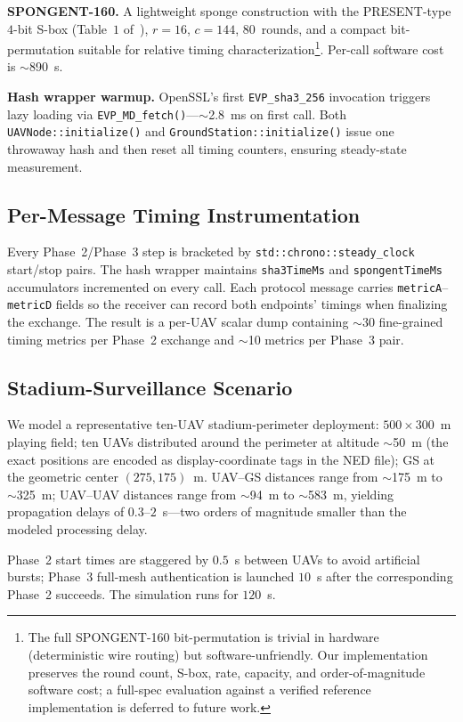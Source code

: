 \documentclass[journal,a4paper,10pt]{IEEEtran}
\begin{document}
\textbf{SPONGENT-160.} A lightweight sponge construction with the
PRESENT-type $4$-bit S-box (Table~$1$ of~\cite{spongent_original}),
$r{=}16$, $c{=}144$, $80$~rounds, and a compact bit-permutation
suitable for relative timing
characterization\footnote{The full SPONGENT-160 bit-permutation is
trivial in hardware (deterministic wire routing) but
software-unfriendly. Our implementation preserves the round count,
S-box, rate, capacity, and order-of-magnitude software cost; a
full-spec evaluation against a verified reference implementation is
deferred to future work.}. Per-call software cost is
$\sim$890~\textmu s.

\textbf{Hash wrapper warmup.} OpenSSL's first \texttt{EVP\_sha3\_256}
invocation triggers lazy loading via
\texttt{EVP\_MD\_fetch()}---$\sim$2.8~ms on first call. Both
\texttt{UAVNode::initialize()} and \texttt{GroundStation::initialize()}
issue one throwaway hash and then reset all timing counters, ensuring
steady-state measurement.

\subsection{Per-Message Timing Instrumentation}
Every Phase~2/Phase~3 step is bracketed by
\texttt{std::chrono::steady\_clock} start/stop pairs. The hash wrapper
maintains \texttt{sha3TimeMs} and \texttt{spongentTimeMs} accumulators
incremented on every call. Each protocol message carries
\texttt{metricA}--\texttt{metricD} fields so the receiver can record
both endpoints' timings when finalizing the exchange. The result is
a per-UAV scalar dump containing $\sim$30 fine-grained timing metrics
per Phase~2 exchange and $\sim$10 metrics per Phase~3 pair.

\subsection{Stadium-Surveillance Scenario}
We model a representative ten-UAV stadium-perimeter deployment:
$500{\times}300$~m playing field; ten UAVs distributed around the
perimeter at altitude $\sim$50~m (the exact positions are encoded as
display-coordinate tags in the NED file); GS at the geometric center
$(275, 175)$~m. UAV--GS distances range from $\sim$175~m to
$\sim$325~m; UAV--UAV distances range from $\sim$94~m to $\sim$583~m,
yielding propagation delays of $0.3$--$2$~\textmu s---two orders
of magnitude smaller than the modeled processing delay.

Phase~2 start times are staggered by $0.5$~s between UAVs to avoid
artificial bursts; Phase~3 full-mesh authentication is launched
$10$~s after the corresponding Phase~2 succeeds. The simulation runs
for $120$~s.
\end{document}
